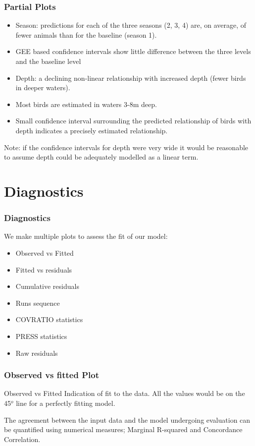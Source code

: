 \begin{frame}
\frametitle{Partial Plots}
\begin{itemize}
\item Season: predictions for each of the three seasons (2, 3, 4) are, on average, of fewer animals than for the baseline (season 1).
\item GEE based confidence intervals show little difference between the three levels and the baseline level \pause
\item Depth: a declining non-linear relationship with increased depth (fewer birds in deeper waters).
\item Most birds are estimated in waters 3-8m deep.
\item Small confidence interval surrounding the predicted relationship of birds with depth indicates a precisely estimated relationship.
\end{itemize}
\pause
\bigskip
Note: if the confidence intervals for depth were very wide it would be reasonable to assume depth could be adequately modelled as a linear term.
\end{frame}


\section{Diagnostics}

\begin{frame}[fragile]
\frametitle{Diagnostics}
We make multiple plots to assess the fit of our model:

\bigskip
\begin{itemize}
\item Observed vs Fitted
\item Fitted vs residuals
\item Cumulative residuals
\item Runs sequence
\item COVRATIO statistics
\item PRESS statistics
\item Raw residuals
\end{itemize}
\end{frame}

\begin{frame}[fragile]
\frametitle{Observed vs fitted Plot}

\begin{block}{Observed vs Fitted}
Indication of fit to the data.  All the values would be on the 45$^o$ line for a perfectly fitting model.    
\end{block}

\noindent The agreement between the input data and the model undergoing evaluation can be quantified using numerical measures; Marginal R-squared and Concordance Correlation. 
\end{frame}

